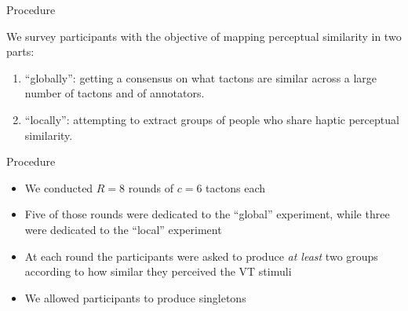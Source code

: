 \begin{frame}{Procedure}

We survey participants with the objective of mapping perceptual similarity in two parts:
\begin{enumerate}
    \item ``globally'': getting a consensus on what tactons are similar across a large number of tactons and of annotators.
    \item ``locally'': attempting to extract groups of people who share haptic perceptual similarity.
\end{enumerate}

\end{frame}

\begin{frame}{Procedure}

\begin{itemize}
    \item We conducted $R=8$ rounds of $c=6$ tactons each
    \item Five of those rounds were dedicated to the ``global'' experiment, while three were dedicated to the ``local'' experiment
    \item At each round the participants were asked to produce \textit{at least} two groups according to how similar they perceived the VT stimuli
    \item We allowed participants to produce singletons
\end{itemize}

\end{frame}